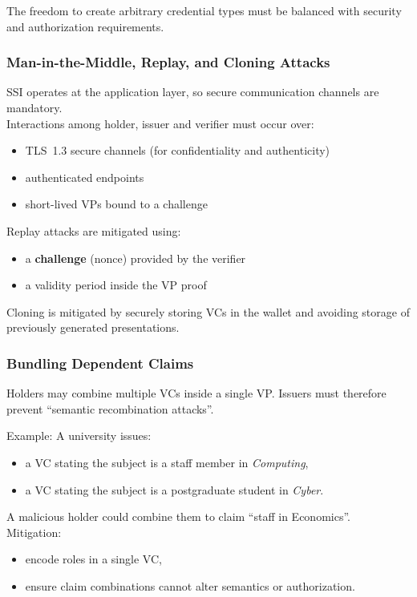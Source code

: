 \noindent
The freedom to create arbitrary credential types must be balanced with security and authorization requirements.

\vspace{0.4cm}
\subsubsection*{Man-in-the-Middle, Replay, and Cloning Attacks}

SSI operates at the application layer, so secure communication channels are mandatory. \\
Interactions among holder, issuer and verifier must occur over:
\begin{itemize}
    \item TLS~1.3 secure channels (for confidentiality and authenticity)
    \item authenticated endpoints
    \item short-lived VPs bound to a challenge
\end{itemize}

\noindent
Replay attacks are mitigated using:
\begin{itemize}
    \item a \textbf{challenge} (nonce) provided by the verifier
    \item a validity period inside the VP proof
\end{itemize}

\noindent
Cloning is mitigated by securely storing VCs in the wallet and avoiding storage of previously generated presentations.

\vspace{0.4cm}
\subsubsection*{Bundling Dependent Claims}

Holders may combine multiple VCs inside a single VP.  
Issuers must therefore prevent “semantic recombination attacks”.

\noindent
Example:  
A university issues:
\begin{itemize}
    \item a VC stating the subject is a staff member in \textit{Computing},
    \item a VC stating the subject is a postgraduate student in \textit{Cyber}.
\end{itemize}

\noindent
A malicious holder could combine them to claim “staff in Economics”.\\
Mitigation:
\begin{itemize}
    \item encode roles in a single VC,
    \item ensure claim combinations cannot alter semantics or authorization.
\end{itemize}

